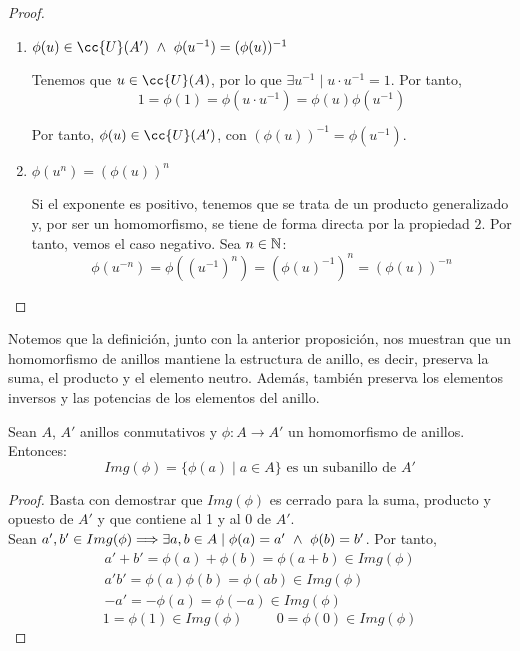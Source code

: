 \begin{proof}
\begin{enumerate}
    \item $\phi(u) \in \cc{U}(A') \y \phi(u^{-1}) = (\phi(u))^{-1}$

    Tenemos que $u \in \cc{U}(A)$, por lo que $\exists u^{-1} \mid u \cdot u^{-1} = 1$. Por tanto,
    $$1 = \phi(1) = \phi(u \cdot u^{-1}) = \phi(u) \phi(u^{-1})$$

    Por tanto, $\phi(u) \in \cc{U}(A')$, con $(\phi(u))^{-1} = \phi(u^{-1})$.
    
    \item $\phi(u^n) = (\phi(u))^n$

    Si el exponente es positivo, tenemos que se trata de un producto generalizado y, por ser un homomorfismo, se tiene de forma directa por la propiedad $2$. Por tanto, vemos el caso negativo. Sea $n \in \mathbb N$:
    $$\phi(u^{-n}) = \phi((u^{-1})^n) = (\phi(u)^{-1})^n = (\phi(u))^{-n}$$
    
\end{enumerate}
\end{proof}

Notemos que la definición, junto con la anterior proposición, nos muestran que un homomorfismo de anillos mantiene la estructura de anillo, es decir, preserva la suma, el producto y el elemento neutro. Además, también preserva los elementos inversos y las potencias de los elementos del anillo.

\begin{prop}
    \label{prop:ImagenHomomorfismo}
    Sean $A$, $A'$ anillos conmutativos y $\phi:A \longrightarrow A'$ un homomorfismo de anillos. Entonces:
    $$Img(\phi) = \{\phi(a) \mid a \in A\} \mbox{ es un subanillo de } A'$$
\end{prop}
\begin{proof}
    Basta con demostrar que $Img(\phi)$ es cerrado para la suma, producto y opuesto de $A'$ y que contiene al 1 y al 0 de $A'$.\\
    
    Sean $a',b' \in Img(\phi) \Longrightarrow \exists a,b \in A \mid \phi(a) = a' \ \land \  \phi(b) = b'$. Por tanto,
    \begin{gather*}
        a'+b' = \phi(a)+\phi(b) = \phi(a+b) \in Img(\phi) \\
        a'b' = \phi(a)\phi(b) = \phi(ab) \in Img(\phi) \\
        -a' = -\phi(a) = \phi(-a) \in Img(\phi)
    \end{gather*}
    $$1 = \phi(1) \in Img(\phi) \hspace{1cm} 0 = \phi(0) \in Img(\phi)$$
\end{proof}

